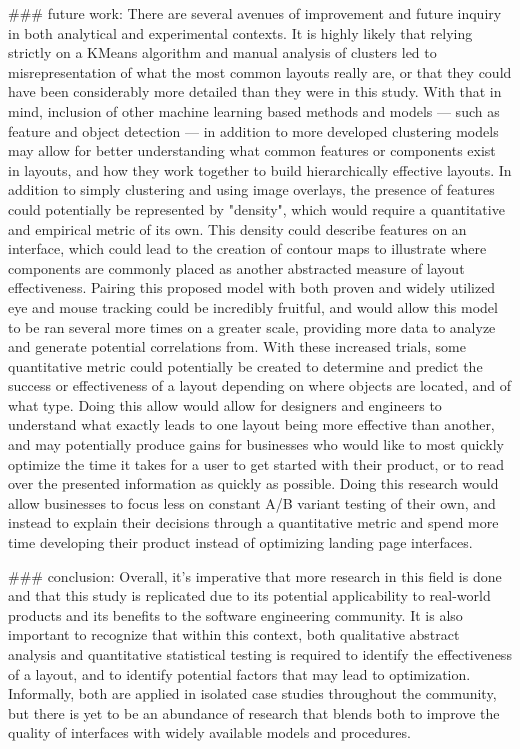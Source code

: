 ### future work:
There are several avenues of improvement and future inquiry in both analytical and experimental contexts. It is highly likely that relying strictly on a KMeans algorithm and manual analysis of clusters led to misrepresentation of what the most common layouts really are, or that they could have been considerably more detailed than they were in this study. With that in mind, inclusion of other machine learning based methods and models — such as feature and object detection — in addition to more developed clustering models may allow for better understanding what common features or components exist in layouts, and how they work together to build hierarchically effective layouts. In addition to simply clustering and using image overlays, the presence of features could potentially be represented by "density", which would require a quantitative and empirical metric of its own. This density could describe features on an interface, which could lead to the creation of contour maps to illustrate where components are commonly placed as another abstracted measure of layout effectiveness. Pairing this proposed model with both proven and widely utilized eye and mouse tracking could be incredibly fruitful, and would allow this model to be ran several more times on a greater scale, providing more data to analyze and generate potential correlations from. With these increased trials, some quantitative metric could potentially be created to determine and predict the success or effectiveness of a layout depending on where objects are located, and of what type. Doing this allow would allow for designers and engineers to understand what exactly leads to one layout being more effective than another, and may potentially produce gains for businesses who would like to most quickly optimize the time it takes for a user to get started with their product, or to read over the presented information as quickly as possible. Doing this research would allow businesses to focus less on constant A/B variant testing of their own, and instead to explain their decisions through a quantitative metric and spend more time developing their product instead of optimizing landing page interfaces.

### conclusion:
Overall, it's imperative that more research in this field is done and that this study is replicated due to its potential applicability to real-world products and its benefits to the software engineering community. It is also important to recognize that within this context, both qualitative abstract analysis and quantitative statistical testing is required to identify the effectiveness of a layout, and to identify potential factors that may lead to optimization. Informally, both are applied in isolated case studies throughout the community, but there is yet to be an abundance of research that blends both to improve the quality of interfaces with widely available models and procedures.


